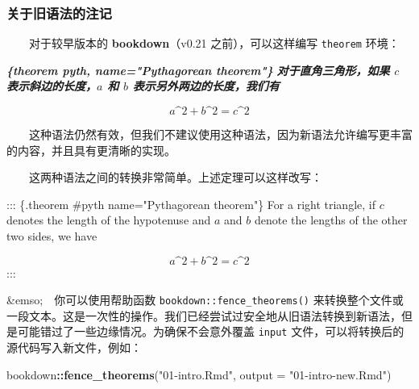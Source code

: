 \documentclass[
  12pt,
]{krantz}
\newenvironment{Shaded}{\begin{snugshade}}{\end{snugshade}}
\newcommand{\AttributeTok}[1]{\textcolor[rgb]{0.13,0.29,0.53}{#1}}
\newcommand{\FunctionTok}[1]{\textcolor[rgb]{0.13,0.29,0.53}{\textbf{#1}}}
\newcommand{\InformationTok}[1]{\textcolor[rgb]{0.56,0.35,0.01}{\textbf{\textit{#1}}}}
\newcommand{\NormalTok}[1]{#1}
\newcommand{\SpecialCharTok}[1]{\textcolor[rgb]{0.81,0.36,0.00}{\textbf{#1}}}
\newcommand{\StringTok}[1]{\textcolor[rgb]{0.31,0.60,0.02}{#1}}
\theoremstyle{definition}
\theoremstyle{definition}
\theoremstyle{definition}
\theoremstyle{definition}
\theoremstyle{remark}
\begin{document}
\hypertarget{theorem-engine}{%
\subsubsection{关于旧语法的注记}\label{theorem-engine}}

  对于较早版本的 \textbf{bookdown}（v0.21 之前），可以这样编写 \texttt{theorem} 环境：

\begin{Shaded}
\begin{Highlighting}[]
\InformationTok{\textasciigrave{}\textasciigrave{}\textasciigrave{}\{theorem pyth, name="Pythagorean theorem"\}}
\InformationTok{对于直角三角形，如果 $c$ 表示斜边的长度，$a$ 和 $b$ 表示另外两边的长度，我们有}

\InformationTok{$$a\^{}2 + b\^{}2 = c\^{}2$$}
\InformationTok{\textasciigrave{}\textasciigrave{}\textasciigrave{}}
\end{Highlighting}
\end{Shaded}

  这种语法仍然有效，但我们不建议使用这种语法，因为新语法允许编写更丰富的内容，并且具有更清晰的实现。

  这两种语法之间的转换非常简单。上述定理可以这样改写：

\begin{Shaded}
\begin{Highlighting}[]
\NormalTok{::: \{.theorem \#pyth name="Pythagorean theorem"\}}
\NormalTok{For a right triangle, if $c$ denotes the length of the hypotenuse}
\NormalTok{and $a$ and $b$ denote the lengths of the other two sides, we have}

\NormalTok{$$a\^{}2 + b\^{}2 = c\^{}2$$}
\NormalTok{:::}
\end{Highlighting}
\end{Shaded}

\&emso; 你可以使用帮助函数 \texttt{bookdown::fence\_theorems()} 来转换整个文件或一段文本。这是一次性的操作。我们已经尝试过安全地从旧语法转换到新语法，但是可能错过了一些边缘情况。为确保不会意外覆盖 \texttt{input} 文件，可以将转换后的源代码写入新文件，例如：

\begin{Shaded}
\begin{Highlighting}[]
\NormalTok{bookdown}\SpecialCharTok{::}\FunctionTok{fence\_theorems}\NormalTok{(}\StringTok{"01{-}intro.Rmd"}\NormalTok{, }\AttributeTok{output =} \StringTok{"01{-}intro{-}new.Rmd"}\NormalTok{)}
\end{Highlighting}
\end{Shaded}
\end{document}
